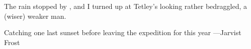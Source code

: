 The rain stopped by , and I turned up at Tetley's looking rather bedraggled, a (wiser) weaker man.


\begin{pagefigure}
\checkoddpage \ifoddpage \forcerectofloat \else \forceversofloat \fi
\centering
 \caption{Catching one last sunset before leaving the expedition for this year ---Jarvist Frost}
 \label{jarv sunset}
\end{pagefigure}
